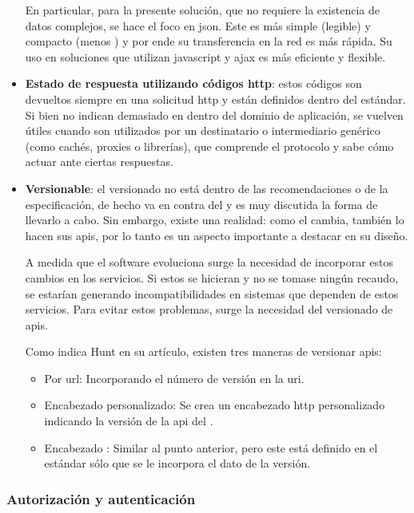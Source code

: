 \begin{itemize}
En particular, para la presente solución, que no requiere la existencia de datos complejos, se hace el foco en \gls{json}. Este es más simple (legible) y compacto (menos ) y por ende su transferencia en la red es más rápida. Su uso en soluciones que utilizan \gls{javascript} y \gls{ajax} es más eficiente y flexible\cite{maeda2012performance}.

\item \textbf{Estado de respuesta utilizando códigos  \gls{http}}: estos códigos son devueltos siempre en una solicitud \gls{http} y están definidos dentro del estándar\cite{fielding2014hypertext}. Si bien no indican demasiado en dentro del dominio de aplicación, se vuelven útiles cuando son utilizados por un destinatario o intermediario genérico (como cachés, proxies o librerías), que comprende el protocolo y sabe cómo actuar ante ciertas respuestas.

\item \textbf{Versionable}: el versionado no está dentro de las recomendaciones o de la especificación, de hecho va en contra del  y es muy discutida la forma de llevarlo a cabo. Sin embargo, existe una realidad: como el  cambia, también lo hacen sus \glspl{api}, por lo tanto es un aspecto importante a destacar en su diseño. 

A medida que el software evoluciona surge la necesidad de incorporar estos cambios en los servicios. Si estos se hicieran y no se tomase ningún recaudo, se estarían generando incompatibilidades en sistemas que dependen de estos servicios. Para evitar estos problemas, surge la necesidad del versionado de \glspl{api}.

Como indica Hunt en su artículo\cite{ApiVersion}, existen tres maneras  de versionar \glspl{api}:
\begin{itemize}
\item Por \gls{url}: Incorporando el número de versión en la \gls{uri}.
\item Encabezado personalizado: Se crea un encabezado \gls{http} personalizado indicando la versión de la \gls{api} del .
\item Encabezado : Similar al punto anterior, pero este está definido en el estándar sólo que se le incorpora el dato de la versión.
\end{itemize}

\end{itemize}

\subsubsection{Autorización y autenticación}
\label{autorizacion_autenticacion}

